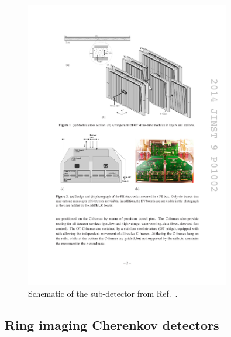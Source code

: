 \begin{figure}[!h]
    \centering
    \includegraphics[width=0.8\textwidth]{figs/Detector/ot_layout.pdf}
    \caption{Schematic of the \ot sub-detector from Ref.~\cite{LHCb-DP-2013-003}.}
    \label{fig:Dec_lhcb_layout}   
\end{figure}

\subsection{Ring imaging Cherenkov detectors}


